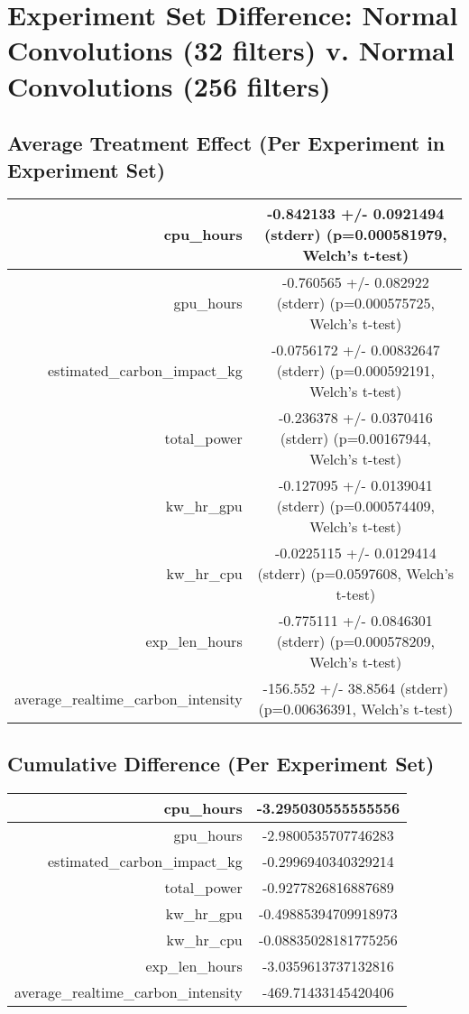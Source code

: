\documentclass{article}%
\begin{document}
%
\normalsize%
\section{Experiment Set Difference: Normal Convolutions (32 filters) v. Normal Convolutions (256 filters)}%
\label{sec:Experiment Set Difference Normal Convolutions (32 filters) v. Normal Convolutions (256 filters)}%
\subsection{Average Treatment Effect (Per Experiment in Experiment Set)}%
\label{subsec:Average Treatment Effect (Per Experiment in Experiment Set)}%
\begin{tabular}{|r|c|}%
\hline%
cpu\_hours&{-}0.842133 +/{-} 0.0921494 (stderr) (p=0.000581979, Welch's t{-}test)\\%
\hline%
gpu\_hours&{-}0.760565 +/{-} 0.082922 (stderr) (p=0.000575725, Welch's t{-}test)\\%
\hline%
estimated\_carbon\_impact\_kg&{-}0.0756172 +/{-} 0.00832647 (stderr) (p=0.000592191, Welch's t{-}test)\\%
\hline%
total\_power&{-}0.236378 +/{-} 0.0370416 (stderr) (p=0.00167944, Welch's t{-}test)\\%
\hline%
kw\_hr\_gpu&{-}0.127095 +/{-} 0.0139041 (stderr) (p=0.000574409, Welch's t{-}test)\\%
\hline%
kw\_hr\_cpu&{-}0.0225115 +/{-} 0.0129414 (stderr) (p=0.0597608, Welch's t{-}test)\\%
\hline%
exp\_len\_hours&{-}0.775111 +/{-} 0.0846301 (stderr) (p=0.000578209, Welch's t{-}test)\\%
\hline%
average\_realtime\_carbon\_intensity&{-}156.552 +/{-} 38.8564 (stderr) (p=0.00636391, Welch's t{-}test)\\%
\hline%
\end{tabular}

%
\subsection{Cumulative Difference (Per Experiment Set)}%
\label{subsec:Cumulative Difference (Per Experiment Set)}%
\begin{tabular}{|r|c|}%
\hline%
cpu\_hours&{-}3.295030555555556\\%
\hline%
gpu\_hours&{-}2.9800535707746283\\%
\hline%
estimated\_carbon\_impact\_kg&{-}0.2996940340329214\\%
\hline%
total\_power&{-}0.9277826816887689\\%
\hline%
kw\_hr\_gpu&{-}0.49885394709918973\\%
\hline%
kw\_hr\_cpu&{-}0.08835028181775256\\%
\hline%
exp\_len\_hours&{-}3.0359613737132816\\%
\hline%
average\_realtime\_carbon\_intensity&{-}469.71433145420406\\%
\hline%
\end{tabular}

%
\end{document}
